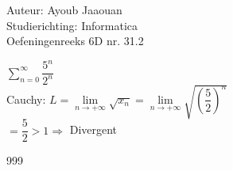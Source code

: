 \documentclass[a4paper]{article}
\begin{document}
\noindent \large Auteur: Ayoub Jaaouan \\
\noindent \large Studierichting: Informatica\\
\noindent \large Oefeningenreeks 6D nr. 31.2\\
\medskip

\normalsize

$\displaystyle\sum\limits_{n=0}^{\infty} \dfrac{5^n}{2^n}$\\

Cauchy: $L = \lim\limits_{n \rightarrow +\infty} \sqrt{x_n} = \lim\limits_{n \rightarrow +\infty} \sqrt{\left(\dfrac{5}{2}\right)^n}$\\

$=  \dfrac{5}{2} > 1\Rightarrow $ Divergent
	


\begin{thebibliography}{999}
\end{thebibliography}
\end{document}

